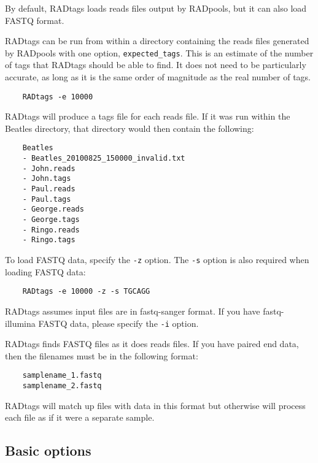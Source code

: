 \documentclass[a4paper]{article}
\begin{document}
By default, RADtags loads reads files output by RADpools, but it can also load FASTQ format.

RADtags can be run from within a directory containing the reads files generated by RADpools with one option, \verb|expected_tags|. This is an estimate of the number of tags that RADtags should be able to find. It does not need to be particularly accurate, as long as it is the same order of magnitude as the real number of tags.

\begin{verbatim}
    RADtags -e 10000
\end{verbatim}

RADtags will produce a tags file for each reads file. If it was run within the Beatles directory, that directory would then contain the following:

\begin{verbatim}
    Beatles
    - Beatles_20100825_150000_invalid.txt
    - John.reads
    - John.tags
    - Paul.reads
    - Paul.tags
    - George.reads
    - George.tags
    - Ringo.reads
    - Ringo.tags
\end{verbatim}


To load FASTQ data, specify the \verb|-z| option. The \verb|-s| option is also required when loading FASTQ data:

\begin{verbatim}
    RADtags -e 10000 -z -s TGCAGG
\end{verbatim}

RADtags assumes input files are in fastq-sanger format. If you have fastq-illumina FASTQ data, please specify the \verb|-i| option.

RADtags finds FASTQ files as it does reads files. If you have paired end data, then the filenames must be in the following format:
\begin{verbatim}
    samplename_1.fastq
    samplename_2.fastq
\end{verbatim}

RADtags will match up files with data in this format but otherwise will process each file as if it were a separate sample.

\subsection{Basic options}
\end{document}
